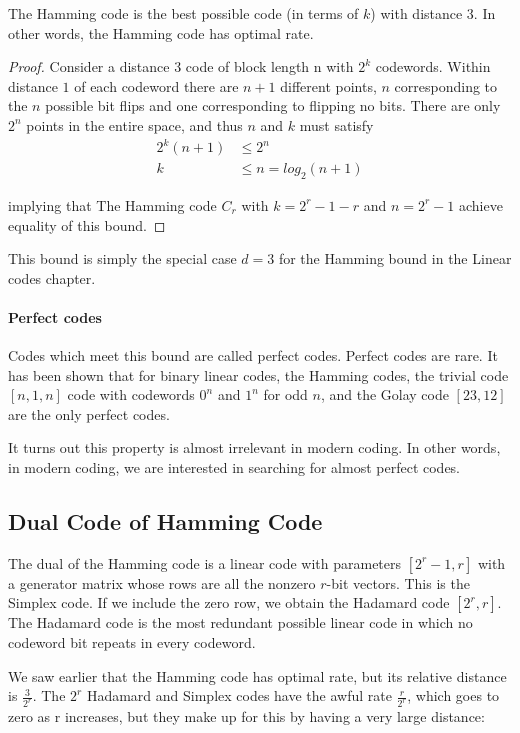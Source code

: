 \begin{theorem}
    The Hamming code is the best possible code (in terms of \(k\)) with distance \(3\). In other words, the Hamming code has optimal rate.
\end{theorem}
\begin{proof}
Consider a distance 3 code of block length n with \(2^k\) codewords. Within distance \(1\) of each codeword there are \(n + 1\) different points, \(n\) corresponding to the \(n\) possible bit flips and one corresponding to flipping no bits. There are only \(2^n\) points in the entire space, and thus \(n\) and \(k\) must satisfy
\begin{align*}
2^k (n+1) &\leq 2^n \\
k &\leq n = log_2(n+1)
\end{align*}

implying that The Hamming code \(C_r\) with \(k = 2^r -1 -r\) and \(n=2^r-1\) achieve equality of this bound.
\end{proof}

This bound is simply the special case \(d=3\) for the Hamming bound in the Linear codes chapter.


\paragraph{Perfect codes}
Codes which meet this bound are called perfect codes. Perfect codes are rare. It has been shown that for binary linear codes, the Hamming codes, the trivial code \([n, 1, n]\) code with codewords \(0^n\) and \(1^n\) for odd \(n\), and the Golay code \([23,12]\) are the only perfect codes. 

It turns out this property is almost irrelevant   in modern coding. In other words, in modern coding, we are interested in searching for almost perfect codes. 

\subsection{Dual Code of Hamming Code}

The dual of the Hamming code is a linear code with parameters \([2^r-1, r]\)
with a generator matrix whose rows are all the nonzero \(r\)-bit vectors. This is the Simplex code. If we include the zero row, we obtain the Hadamard code \([2^r, r]\). The Hadamard code is the most redundant possible linear code in which no codeword bit repeats in every codeword.

We saw earlier that the Hamming code has optimal rate, but its relative distance is \(\frac{3}{2^r}\). The \(2^r\)
Hadamard and Simplex codes have the awful rate \(\frac{r}{2^r}\), which goes to zero as r increases, but they
make up for this by having a very large distance:


